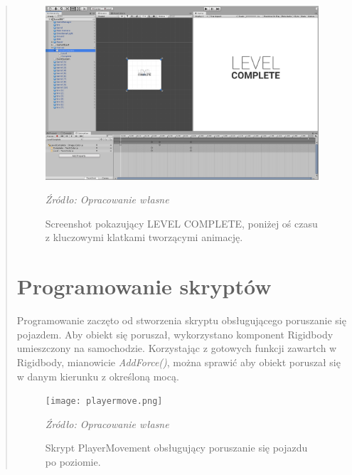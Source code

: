 \begin{quotation}
\begin{figure}[!h]
\centering
  \includegraphics[width=0.80\linewidth]{levelcomplete2.png}
  \caption{Screenshot pokazujący LEVEL COMPLETE, poniżej oś czasu z kluczowymi klatkami tworzącymi animację.}\label{rys_3}
  \begin{minipage}[t]{0.75\linewidth}
    \emph{Źródło: Opracowanie własne}
  \end{minipage}
\end{figure}

\newpage
\section{Programowanie skryptów}
\indent Programowanie zaczęto od stworzenia skryptu obsługującego poruszanie się pojazdem. Aby obiekt się poruszał, wykorzystano komponent Rigidbody umieszczony na samochodzie. Korzystając z gotowych funkcji zawartch w Rigidbody, mianowicie \textit{AddForce()}, można sprawić aby obiekt poruszał się w danym kierunku z określoną mocą.

\begin{figure}[!h]
\centering
  \texttt{[image: playermove.png]}
  \caption{Skrypt PlayerMovement obsługujący poruszanie się pojazdu po poziomie.}\label{rys_4}
  \begin{minipage}[t]{0.75\linewidth}
    \emph{Źródło: Opracowanie własne}
  \end{minipage}
\end{figure}


\end{quotation}
